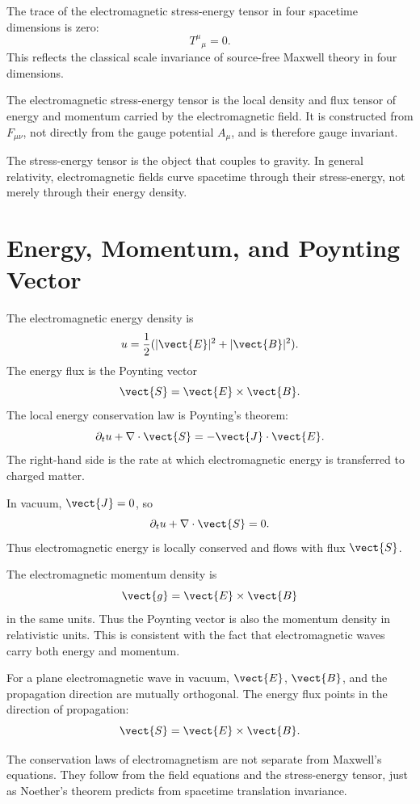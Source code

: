 The trace of the electromagnetic stress-energy tensor in four spacetime
dimensions is zero:
\[
    T^\mu{}_{\mu}=0.
\]
This reflects the classical scale invariance of source-free Maxwell theory in
four dimensions.

\begin{definitionbox}
The electromagnetic stress-energy tensor is the local density and flux tensor of
energy and momentum carried by the electromagnetic field. It is constructed from
\(F_{\mu\nu}\), not directly from the gauge potential \(A_\mu\), and is therefore
gauge invariant.
\end{definitionbox}

The stress-energy tensor is the object that couples to gravity. In general
relativity, electromagnetic fields curve spacetime through their stress-energy,
not merely through their energy density.

\section{Energy, Momentum, and Poynting Vector}

The electromagnetic energy density is
\[
    u=\frac{1}{2}(|\vect{E}|^2+|\vect{B}|^2).
\]
The energy flux is the Poynting vector
\[
    \vect{S}=\vect{E}\times\vect{B}.
\]
The local energy conservation law is Poynting's theorem:
\[
    \partial_t u+\nabla\cdot\vect{S}=-\vect{J}\cdot\vect{E}.
\]
The right-hand side is the rate at which electromagnetic energy is transferred
to charged matter.

In vacuum, \(\vect{J}=0\), so
\[
    \partial_t u+\nabla\cdot\vect{S}=0.
\]
Thus electromagnetic energy is locally conserved and flows with flux
\(\vect{S}\).

The electromagnetic momentum density is
\[
    \vect{g}=\vect{E}\times\vect{B}
\]
in the same units. Thus the Poynting vector is also the momentum density in
relativistic units. This is consistent with the fact that electromagnetic waves
carry both energy and momentum.

\begin{examplebox}
For a plane electromagnetic wave in vacuum, \(\vect{E}\), \(\vect{B}\), and the
propagation direction are mutually orthogonal. The energy flux points in the
direction of propagation:
\[
    \vect{S}=\vect{E}\times\vect{B}.
\]
\end{examplebox}

The conservation laws of electromagnetism are not separate from Maxwell's
equations. They follow from the field equations and the stress-energy tensor,
just as Noether's theorem predicts from spacetime translation invariance.

